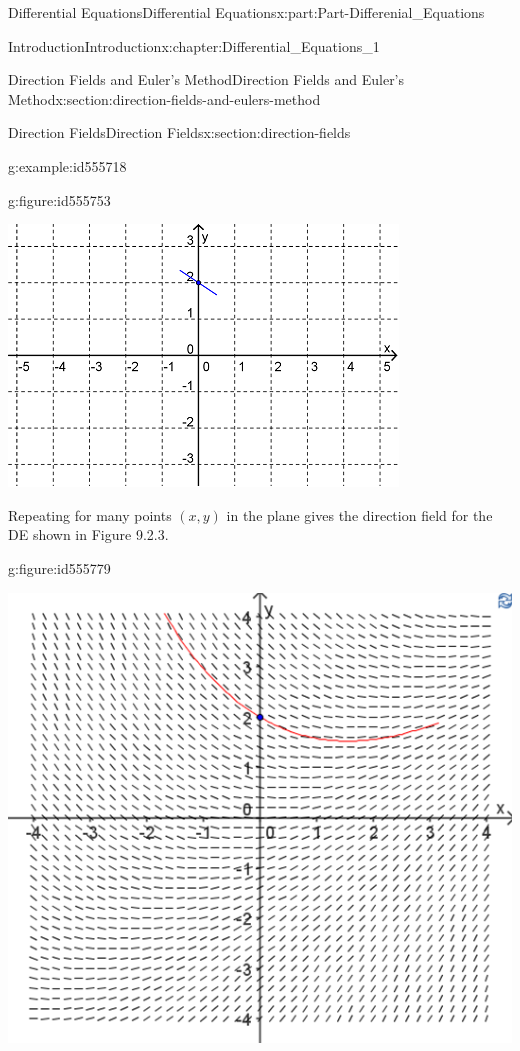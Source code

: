 \documentclass[oneside,10pt,]{book}
\numberwithin{equation}{section}
\begin{document}
\begin{partptx}{Differential Equations}{}{Differential Equations}{}{}{x:part:Part-Differenial_Equations}
\begin{chapterptx}{Introduction}{}{Introduction}{}{}{x:chapter:Differential_Equations_1}
\begin{sectionptx}{Direction Fields and Euler's Method}{}{Direction Fields and Euler's Method}{}{}{x:section:direction-fields-and-eulers-method}
\begin{sectionptx}{Direction Fields}{}{Direction Fields}{}{}{x:section:direction-fields}
\begin{example}{}{g:example:id555718}
\begin{figureptx}{}{g:figure:id555753}{}
\begin{image}{0.125}{0.75}{0.125}%
\includegraphics[width=\linewidth]{./DifferentialEquations/Images/1/2_example8.png}
\end{image}%
\tcblower
\end{figureptx}%
 Repeating for many points \((x,y)\) in the plane gives the direction field for the DE shown in Figure 9.2.3. \begin{figureptx}{}{g:figure:id555779}{}%
\begin{image}{0.125}{0.75}{0.125}%
\includegraphics[width=\linewidth]{./DifferentialEquations/Images/1/2_example8_2.png}
\end{image}%

\end{figureptx}
\end{example}
\end{sectionptx}
\end{sectionptx}
\end{chapterptx}
\end{partptx}
\end{document}
